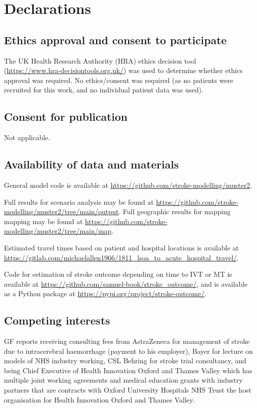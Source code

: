 \section{Declarations}

\subsection{Ethics approval and consent to participate}

The UK Health Research Authority (HRA) ethics decision tool (\url{https://www.hra-decisiontools.org.uk/}) was used to determine whether ethics approval was required. No ethics/consent was required (as no patients were recruited for this work, and no individual patient data was used).

\subsection{Consent for publication}

Not applicable.

\subsection{Availability of data and materials}

General model code is available at \url{https://github.com/stroke-modelling/muster2}.

Full results for scenario analysis may be found at \url{https://github.com/stroke-modelling/muster2/tree/main/output}. Full geographic results for mapping mapping may be found at \url{https://github.com/stroke-modelling/muster2/tree/main/map}.

Estimated travel times based on patient and hospital locations is available at \url{https://gitlab.com/michaelallen1966/1811_lsoa_to_acute_hospital_travel/}.

Code for estimation of stroke outcome depending on time to IVT or MT is available at \url{https://github.com/samuel-book/stroke_outcome/}, and is available as a Python package at \url{https://pypi.org/project/stroke-outcome/}.

\subsection*{Competing interests}

GF reports receiving consulting fees from AstraZeneca for management of stroke due to intracerebral haemorrhage (payment to his employer), Bayer for lecture on models of NHS industry working, CSL Behring for stroke trial consultancy, and being Chief Executive of Health Innovation Oxford and Thames Valley which has multiple joint working agreements and medical education grants with industry partners that are contracts with Oxford University Hospitals NHS Trust the host organisation for Health Innovation Oxford and Thames Valley.

